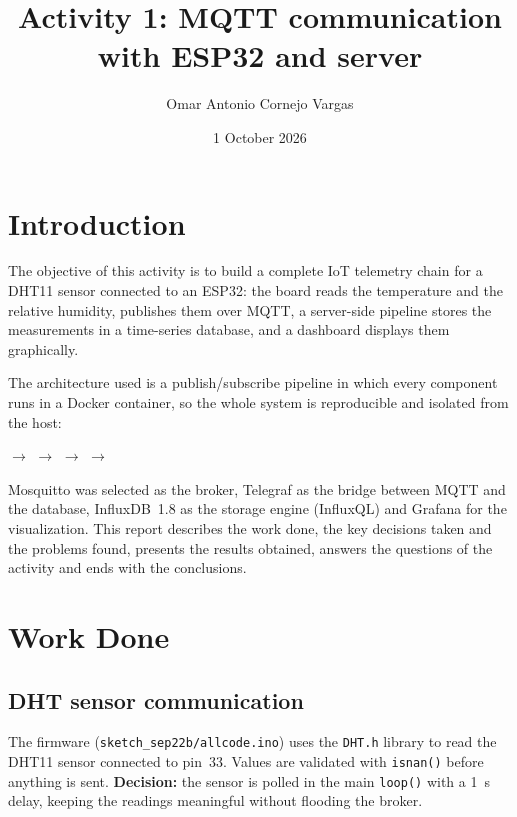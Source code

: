 \documentclass[11pt,a4paper]{article}
\title{\textbf{Activity 1: MQTT communication with ESP32 and server}}
\author{Omar Antonio Cornejo Vargas}
\date{1 October 2026}
\begin{document}
\maketitle

\section{Introduction}

The objective of this activity is to build a complete IoT telemetry chain for a DHT11
sensor connected to an ESP32: the board reads the temperature and the relative humidity,
publishes them over MQTT, a server-side pipeline stores the measurements in a time-series
database, and a dashboard displays them graphically.

The architecture used is a publish/subscribe pipeline in which every component runs in a
Docker container, so the whole system is reproducible and isolated from the host:

\begin{center}
\small
{} $\rightarrow$
 $\rightarrow$
 $\rightarrow$
 $\rightarrow$
\end{center}

Mosquitto was selected as the broker, Telegraf as the bridge between MQTT and the database,
InfluxDB~1.8 as the storage engine (InfluxQL) and Grafana for the visualization. This report
describes the work done, the key decisions taken and the problems found, presents the
results obtained, answers the questions of the activity and ends with the conclusions.

\section{Work Done}

\subsection{DHT sensor communication}

The firmware (\texttt{sketch\_sep22b/allcode.ino}) uses the \texttt{DHT.h} library to read the
DHT11 sensor connected to pin~33. Values are validated with \texttt{isnan()} before anything is sent. \textbf{Decision:} the sensor is
polled in the main \texttt{loop()} with a 1~s delay, keeping the readings meaningful without flooding the
broker.
\end{document}
